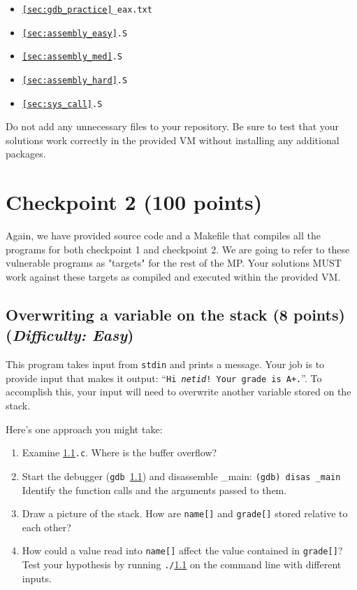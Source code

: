 \documentclass[letterpaper,12pt]{report}
\begin{document}
{\begin{itemize}
\item \texttt{\ref{sec:gdb_practice}\_eax.txt}

\item \texttt{\ref{sec:assembly_easy}.S}

\item \texttt{\ref{sec:assembly_med}.S}

\item \texttt{\ref{sec:assembly_hard}.S}

\item \texttt{\ref{sec:sys_call}.S}

\end{itemize}

\medskip

Do not add any unnecessary files to your repository.  Be sure to test that your solutions work correctly in the provided VM without installing any additional packages.






\newpage

\section{Checkpoint 2 (100 points)}
\label{sec:checkpoint_2}
Again, we have provided source code and a Makefile that compiles all the programs for both checkpoint 1 and checkpoint 2. We are going to refer to these vulnerable programs as "targets" for the rest of the MP. Your solutions MUST work against these targets as compiled and executed within the provided VM.



\subsection{Overwriting a variable on the stack (8 points)\hfill\rm\normalsize (\emph{Difficulty: Easy})}
\label{sec:target0}

This program takes input from \texttt{stdin} and prints a message.  Your job is to provide input that makes it output: ``\texttt{Hi \emph{netid}! Your grade is A+.}''.  To accomplish this, your input will need to overwrite another variable stored on the stack.

\smallskip

Here's one approach you might take:
\begin{enumerate}
\item Examine \texttt{\ref{sec:target0}.c}.  Where is the buffer overflow?
\item Start the debugger (\texttt{gdb \ref{sec:target0}}) and disassemble \_main: \texttt{(gdb) disas \_main}\\
Identify the function calls and the arguments passed to them.
\item Draw a picture of the stack.  How are \texttt{name[]} and \texttt{grade[]} stored relative to each other?
\item How could a value read into \texttt{name[]} affect the value contained in \texttt{grade[]}?  Test your hypothesis by running \texttt{./\ref{sec:target0}} on the command line with different inputs.
\end{enumerate}

}
\end{document}
